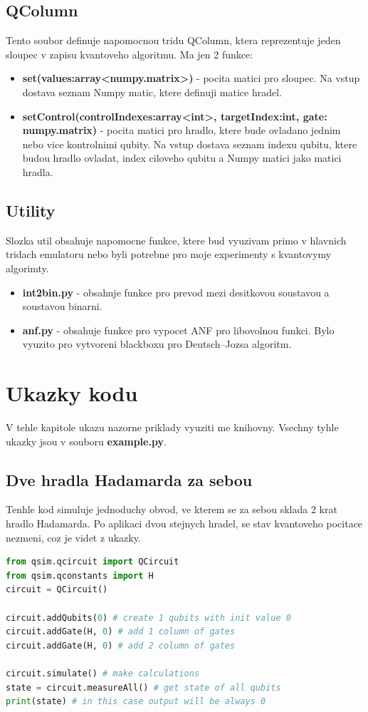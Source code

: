 \documentclass[11pt]{article}
\begin{document}
\subsection{QColumn}
Tento soubor  definuje napomocnou tridu QColumn, ktera reprezentuje jeden sloupec v zapisu kvantoveho algoritmu.
Ma jen 2 funkce:
\begin{itemize}
    \item \textbf{set(values:array<numpy.matrix>)} - pocita matici pro sloupec.
          Na vstup dostava seznam Numpy matic, ktere definuji matice hradel.
    \item \textbf{setControl(controlIndexes:array<int>, targetIndex:int, gate: numpy.matrix)} - pocita matici pro hradlo, ktere bude ovladano jednim nebo vice kontrolnimi qubity.
          Na vstup dostava seznam indexu qubitu, ktere budou hradlo ovladat, index ciloveho qubitu a Numpy matici jako matici hradla.
\end{itemize}

\subsection{Utility}
Slozka util obsahuje napomocne funkce, ktere bud vyuzivam primo v hlavnich tridach emulatoru nebo byli potrebne pro moje experimenty s kvantovymy algorimty.
\begin{itemize}
    \item \textbf{int2bin.py} - obsahuje funkce pro prevod mezi desitkovou soustavou a soustavou binarni.
    \item \textbf{anf.py} - obsahuje funkce pro vypocet ANF pro libovolnou funkci.
          Bylo vyuzito pro vytvoreni blackboxu pro Deutsch–Jozsa algoritm.
\end{itemize}

\newpage

\section{Ukazky kodu}
V tehle kapitole ukazu nazorne priklady vyuziti me knihovny.
Vsechny tyhle ukazky jsou v souboru \textbf{example.py}.

\subsection{Dve hradla Hadamarda za sebou}
Tenhle kod simuluje jednoduchy obvod, ve kterem se za sebou sklada 2 krat hradlo Hadamarda.
Po aplikaci dvou stejnych hradel, se stav kvantoveho pocitace nezmeni, coz je videt z ukazky.
\begin{lstlisting}[language=Python, caption=Double Hadamard gates]
from qsim.qcircuit import QCircuit
from qsim.qconstants import H
circuit = QCircuit()

circuit.addQubits(0) # create 1 qubits with init value 0
circuit.addGate(H, 0) # add 1 column of gates
circuit.addGate(H, 0) # add 2 column of gates

circuit.simulate() # make calculations
state = circuit.measureAll() # get state of all qubits
print(state) # in this case output will be always 0
\end{lstlisting}
\end{document}
